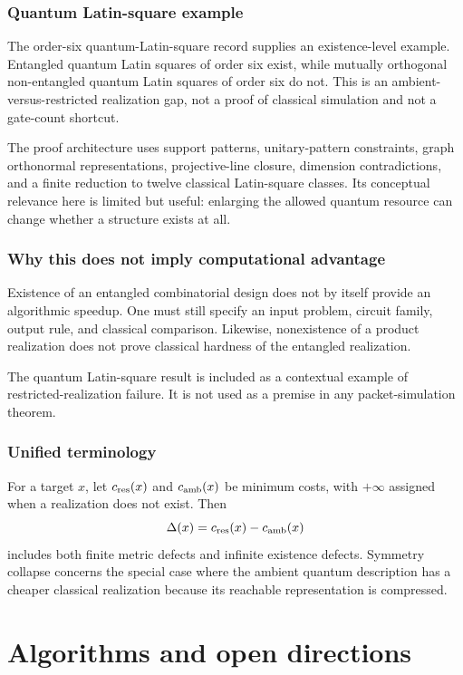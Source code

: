 \subsection{Quantum Latin-square example}
The order-six quantum-Latin-square record supplies an existence-level example. Entangled quantum Latin squares of order six exist, while mutually orthogonal non-entangled quantum Latin squares of order six do not. This is an ambient-versus-restricted realization gap, not a proof of classical simulation and not a gate-count shortcut.

The proof architecture uses support patterns, unitary-pattern constraints, graph orthonormal representations, projective-line closure, dimension contradictions, and a finite reduction to twelve classical Latin-square classes. Its conceptual relevance here is limited but useful: enlarging the allowed quantum resource can change whether a structure exists at all.

\subsection{Why this does not imply computational advantage}
Existence of an entangled combinatorial design does not by itself provide an algorithmic speedup. One must still specify an input problem, circuit family, output rule, and classical comparison. Likewise, nonexistence of a product realization does not prove classical hardness of the entangled realization.

\begin{scopebox}
The quantum Latin-square result is included as a contextual example of restricted-realization failure. It is not used as a premise in any packet-simulation theorem.
\end{scopebox}

\subsection{Unified terminology}
For a target $x$, let $c_{\rm res}(x)$ and $c_{\rm amb}(x)$ be minimum costs, with $+\infty$ assigned when a realization does not exist. Then
\[
\Delta(x)
=
c_{\rm res}(x)-c_{\rm amb}(x)
\]
includes both finite metric defects and infinite existence defects. Symmetry collapse concerns the special case where the ambient quantum description has a cheaper classical realization because its reachable representation is compressed.

\chapter{Algorithms and open directions}

